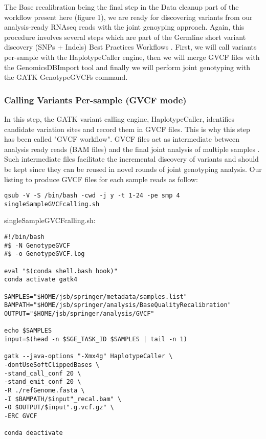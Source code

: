 The Base recalibration being the final step in the Data cleanup part of the workflow present here (figure 1), we are ready for discovering variants from our analysis-ready RNAseq reads with the joint genoyping approach. Again, this procedure involves several steps which are part of the Germline short variant discovery (SNPs + Indels) Best Practices Workflows \cite{GATK_BP_Germline}. First, we will call variants per-sample with the HaplotypeCaller engine, then we will merge GVCF files with the GenomicsDBImport tool and finally we will perform joint genotyping with the GATK GenotypeGVCFs command.




\subsubsection{Calling Variants Per-sample (GVCF mode)}


In this step, the GATK variant calling engine, HaplotypeCaller, identifies candidate variation sites and record them in GVCF files. This is why this step has been called "GVCF workflow". GVCF files act as intermediate between analysis ready reads (BAM files) and the final joint analysis of multiple samples \cite{GATK_jointCalling_1}. Such intermediate files facilitate the incremental discovery of variants and should be kept since they can be reused in novel rounds of joint genotyping analysis. Our listing to produce GVCF files for each sample reads as follow:

\begin{verbatim}
qsub -V -S /bin/bash -cwd -j y -t 1-24 -pe smp 4  singleSampleGVCFcalling.sh
\end{verbatim}

singleSampleGVCFcalling.sh:

\begin{verbatim}
#!/bin/bash
#$ -N GenotypeGVCF
#$ -o GenotypeGVCF.log

eval "$(conda shell.bash hook)"
conda activate gatk4

SAMPLES="$HOME/jsb/springer/metadata/samples.list"
BAMPATH="$HOME/jsb/springer/analysis/BaseQualityRecalibration"
OUTPUT="$HOME/jsb/springer/analysis/GVCF"

echo $SAMPLES
input=$(head -n $SGE_TASK_ID $SAMPLES | tail -n 1)

gatk --java-options "-Xmx4g" HaplotypeCaller \
‐dontUseSoftClippedBases \
‐stand_call_conf 20 \
‐stand_emit_conf 20 \
-R ./refGenome.fasta \
-I $BAMPATH/$input"_recal.bam" \
-O $OUTPUT/$input".g.vcf.gz" \
-ERC GVCF

conda deactivate
\end{verbatim}



